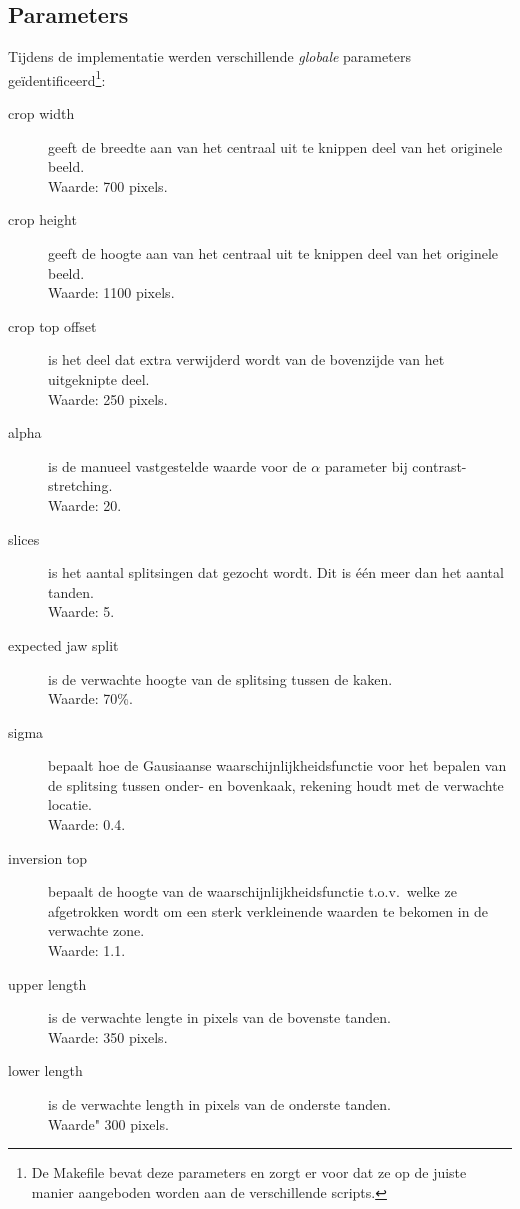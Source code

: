 \documentclass[10pt,a4paper]{article}
\begin{document}
\subsection*{Parameters}

Tijdens de implementatie werden verschillende \emph{globale} parameters ge\"identificeerd\footnote{De Makefile bevat deze parameters en zorgt er voor dat ze op de juiste manier aangeboden worden aan de verschillende scripts.}:

\begin{description}
\item[crop width]  geeft de breedte aan van het centraal uit te knippen deel van het originele beeld.\\ Waarde: 700 pixels.
\item[crop height] geeft de hoogte aan van het centraal uit te knippen deel van het originele beeld.\\ Waarde: 1100 pixels.
\item[crop top offset] is het deel dat extra verwijderd wordt van de bovenzijde van het uitgeknipte deel. \\ Waarde: 250 pixels.
\item[alpha] is de manueel vastgestelde waarde voor de $\alpha$ parameter bij contrast-stretching. \\ Waarde: 20.
\item[slices] is het aantal splitsingen dat gezocht wordt. Dit is \'e\'en meer dan het aantal tanden. \\ Waarde: 5.
\item[expected jaw split] is de verwachte hoogte van de splitsing tussen de kaken. \\ Waarde: 70\%.
\item[sigma] bepaalt hoe de Gausiaanse waarschijnlijkheidsfunctie voor het bepalen van de splitsing tussen onder- en bovenkaak, rekening houdt met de verwachte locatie.\\ Waarde: 0.4.
\item[inversion top] bepaalt de hoogte van de waarschijnlijkheidsfunctie t.o.v.\ welke ze afgetrokken wordt om een sterk verkleinende waarden te bekomen in de verwachte zone. \\ Waarde: 1.1.
\item[upper length] is de verwachte lengte in pixels van de bovenste tanden.\\ Waarde: 350 pixels.
\item[lower length] is de verwachte length in pixels van de onderste tanden. \\ Waarde" 300 pixels.
\end{description}
\end{document}
